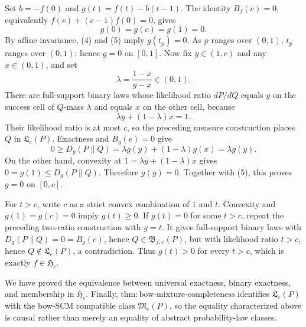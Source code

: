 Set \(b=-f(0)\) and \(g(t)=f(t)-b(t-1)\).  The identity \(B_f(e)=0\), equivalently \(f(c)+(c-1)f(0)=0\), gives
\[
 g(0)=g(c)=g(1)=0. \tag{5}
\]
By affine invariance, (4) and (5) imply \(g(t_p)=0\).  As \(p\) ranges over \((0,1)\), \(t_p\) ranges over \((0,1)\); hence \(g=0\) on \([0,1]\).  Now fix \(y\in(1,c)\) and any \(x\in(0,1)\), and set
\[
 \lambda=\frac{1-x}{y-x}\in(0,1).
\]
There are full-support binary laws whose likelihood ratio \(dP/dQ\) equals \(y\) on the success cell of \(Q\)-mass \(\lambda\) and equals \(x\) on the other cell, because
\[
 \lambda y+(1-\lambda)x=1.
\]
Their likelihood ratio is at most \(c\), so the preceding measure construction places \(Q\) in \(\mathfrak L_e(P)\).  Exactness and \(B_g(e)=0\) give
\[
 0\ge D_g(P\|Q)=\lambda g(y)+(1-\lambda)g(x)=\lambda g(y).
\]
On the other hand, convexity at \(1=\lambda y+(1-\lambda)x\) gives \(0=g(1)\le D_g(P\|Q)\).  Therefore \(g(y)=0\).  Together with (5), this proves \(g=0\) on \([0,c]\).

For \(t>c\), write \(c\) as a strict convex combination of \(1\) and \(t\).  Convexity and \(g(1)=g(c)=0\) imply \(g(t)\ge0\).  If \(g(t)=0\) for some \(t>c\), repeat the preceding two-ratio construction with \(y=t\).  It gives full-support binary laws with \(D_g(P\|Q)=0=B_g(e)\), hence \(Q\in\mathfrak B_{f,e}(P)\), but with likelihood ratio \(t>c\), hence \(Q\notin\mathfrak L_e(P)\), a contradiction.  Thus \(g(t)>0\) for every \(t>c\), which is exactly \(f\in\mathfrak H_c\).

We have proved the equivalence between universal exactness, binary exactness, and membership in \(\mathfrak H_c\).  Finally, \(\mathrm{thm:bow\text{-}mixture\text{-}completeness}\) identifies \(\mathfrak L_e(P)\) with the bow-SCM compatible class \(\mathfrak M_e(P)\), so the equality characterized above is causal rather than merely an equality of abstract probability-law classes.